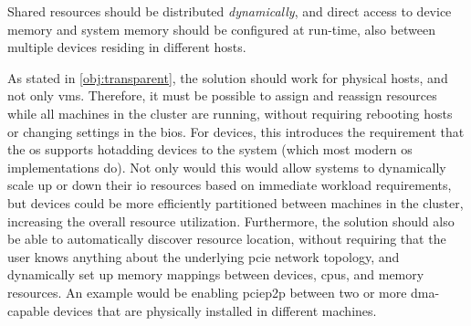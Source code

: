 \begin{objective}\label{obj:dynamic}
    Shared resources should be distributed \emph{dynamically}, and direct access to device memory and system memory should be configured at run-time, also between multiple devices residing in different hosts.
\end{objective}
As stated in \cref{obj:transparent}, the solution should work for physical hosts, and not only \glspl{vm}. Therefore, it must be possible to assign and reassign resources while all machines in the cluster are running, without requiring rebooting hosts or changing settings in the \gls{bios}.
For devices, this introduces the requirement that the \gls{os} supports \gls{hotadding} devices to the system (which most modern \gls{os} implementations do).
Not only would this would allow systems to dynamically scale up or down their \gls{io} resources based on immediate workload requirements, but devices could be more efficiently partitioned between machines in the cluster, increasing the overall resource utilization. 
Furthermore, the solution should also be able to automatically discover resource location, without requiring that the user knows anything about the underlying \gls{pcie} network topology, and dynamically set up memory mappings between devices, \glspl{cpu}, and memory resources. An example would be enabling \gls{pciep2p} between two or more \gls{dma}-capable devices that are physically installed in different machines.

